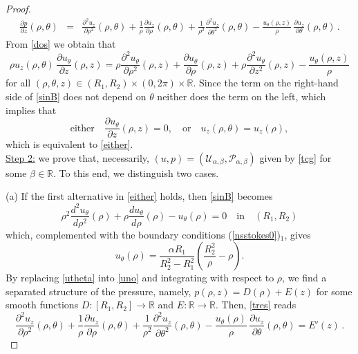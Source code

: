 \documentclass[a4paper,11pt]{amsart}
\numberwithin{equation}{section}
\numberwithin{figure}{section}
\newcommand{\R}{\mathbb{R}}
\def\U{{\mathcal U}}
\def\P{{\mathcal P}}
\def\eq#1{(\ref{#1})}
\begin{document}
\begin{proof}
\begin{eqnarray}
			\frac{\partial p}{\partial z}(\rho, \theta) &=& \frac{\partial^2 u_z}{\partial\rho^2}(\rho,\theta) +\frac{1}{\rho}\frac{\partial u_z}{\partial\rho}(\rho,\theta)+\frac{1}{\rho^2}\frac{\partial^2 u_z}{\partial\theta^2}(\rho,\theta)-
			\frac{u_\theta(\rho,z)}{\rho}\, \frac{\partial u_z}{\partial\theta}(\rho,\theta)\, .\label{tres}
		\end{eqnarray}
		From \eqref{dos} we obtain that
		\begin{equation}\label{sinB}
			\rho u_z(\rho,\theta)\, \frac{\partial u_{\theta}}{\partial z}(\rho,z)=\rho\frac{\partial^2 u_{\theta}}{\partial\rho^2}(\rho,z) +
			\frac{\partial u_{\theta}}{\partial\rho}(\rho,z)+\rho\frac{\partial^2u_{\theta}}{\partial z^2}(\rho,z)-\frac{u_\theta(\rho,z)}{\rho}
		\end{equation}
		for all $(\rho, \theta, z)\in (R_1,R_2)\times (0, 2\pi)\times \mathbb{R}$. Since the term on the right-hand side of \eqref{sinB} does not depend on $\theta$ neither does the term on the left, which implies that
		$$
		\text{either}\quad \frac{\partial u_{\theta}}{\partial z}(\rho,z)=0,\quad \text{or}\quad u_z(\rho,\theta)=u_z(\rho),
		$$
		which is equivalent to \eqref{either}.\\
		\underline{Step 2:} we prove that, necessarily, $(u,p)=(\U_{\alpha,\beta}, \P_{\alpha,\beta})$ given by \eqref{tcg}
		for some $\beta\in\R$. To this end, we distinguish two cases.\par
		(a) If the first alternative in \eqref{either} holds, then \eqref{sinB} becomes
		$$
		\rho^2\frac{d^2 u_{\theta}}{d\rho^2}(\rho)+\rho\frac{du_{\theta}}{d\rho}(\rho)-u_\theta(\rho)=0\quad\text{in}\quad (R_1,R_2)
		$$
		which, complemented with the boundary conditions \eq{nsstokes0}$_1$, gives
		\begin{equation}\label{utheta}
			u_\theta(\rho)=\frac{\alpha R_1}{R_2^2 -R_1^2} \left(\frac{R_2^2}{\rho}-\rho\right) .
		\end{equation}
		By replacing \eqref{utheta} into \eqref{uno} and integrating with respect to $\rho$, we find a separated structure of the pressure, namely,
		$
		p(\rho, z)=D(\rho)+E(z)
		$
		for some smooth functions $D:[R_1,R_2]\to\R$ and $E:\R\to\R$. Then, \eqref{tres} reads
		\begin{equation}\label{eq-uz}
			\frac{\partial^2 u_z}{\partial\rho^2}(\rho,\theta)+\frac{1}{\rho}\frac{\partial u_z}{\partial\rho}(\rho,\theta)+\frac{1}{\rho^2}\frac{\partial^2 u_z}{\partial\theta^2}(\rho,\theta)-\frac{u_\theta(\rho)}{\rho}\, \frac{\partial u_z}{\partial\theta}(\rho,\theta)=E'(z)\, .
		\end{equation}

\end{proof}
\end{document}
